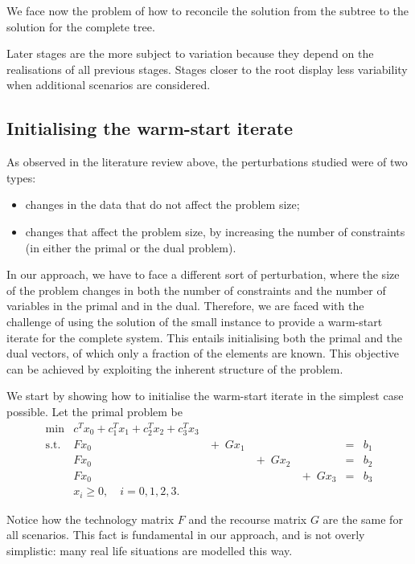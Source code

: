 We face now the problem of how to reconcile the solution from 
the subtree to the solution for the complete tree.

\hrulefill

Later stages are the more subject to variation because they 
depend on the realisations of all previous stages. Stages 
closer to the root display less variability when additional 
scenarios are considered.

%
%
\subsection{Initialising the warm-start iterate}

As observed in the literature review above, the perturbations 
studied were of two types:
\begin{itemize}
\item changes in the data that do not affect the problem size;
\item changes that affect the problem size, by increasing the 
number of constraints (in either the primal or the dual problem).
\end{itemize}

In our approach, we have to face a different sort of 
perturbation, where the size of the problem changes in both 
the number of constraints and the number of variables in the 
primal and in the dual. Therefore, we are faced with the 
challenge of using the solution of the small instance to 
provide a warm-start iterate for the complete system. This 
entails initialising both the primal and the dual vectors, of 
which only a fraction of the elements are known. This objective 
can be achieved by exploiting the inherent structure of the problem.

We start by showing how to initialise the warm-start iterate 
in the simplest case possible. Let the primal problem be
\[
\begin{array}{rllllll}
  \min & c^T x_0 + c_1^Tx_1 + c_2^Tx_2 + c_3^Tx_3 \\
  \mbox{s.t.} & Fx_0 &   \!\!\! + \; Gx_1 &&& = & b_1 \\
              & Fx_0 &&  \!\!\! + \; Gx_2 &&  = & b_2 \\
              & Fx_0 &&& \!\!\! + \; Gx_3 &   = & b_3 \\
              & x_i \ge 0, \quad i = 0, 1, 2, 3.
\end{array}
\]

Notice how the technology matrix $F$ and the recourse matrix 
$G$ are the same for all scenarios. This fact is fundamental 
in our approach, and is not overly simplistic: many real life 
situations are modelled this way. 


